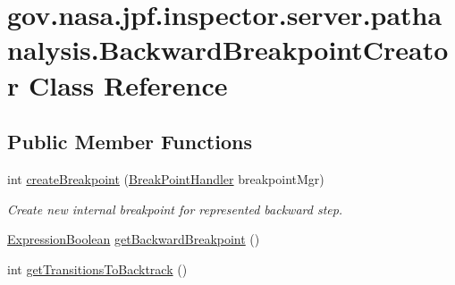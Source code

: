 \hypertarget{classgov_1_1nasa_1_1jpf_1_1inspector_1_1server_1_1pathanalysis_1_1_backward_breakpoint_creator}{}\section{gov.\+nasa.\+jpf.\+inspector.\+server.\+pathanalysis.\+Backward\+Breakpoint\+Creator Class Reference}
\label{classgov_1_1nasa_1_1jpf_1_1inspector_1_1server_1_1pathanalysis_1_1_backward_breakpoint_creator}
\subsection*{Public Member Functions}
\begin{DoxyCompactItemize}
\item 
int \hyperlink{classgov_1_1nasa_1_1jpf_1_1inspector_1_1server_1_1pathanalysis_1_1_backward_breakpoint_creator_aa397e2c3d0f2825ec1602e733b844352}{create\+Breakpoint} (\hyperlink{classgov_1_1nasa_1_1jpf_1_1inspector_1_1server_1_1breakpoints_1_1_break_point_handler}{Break\+Point\+Handler} breakpoint\+Mgr)
\begin{DoxyCompactList}\small\item\em Create new internal breakpoint for represented backward step. \end{DoxyCompactList}\item 
\hyperlink{classgov_1_1nasa_1_1jpf_1_1inspector_1_1server_1_1expression_1_1_expression_boolean}{Expression\+Boolean} \hyperlink{classgov_1_1nasa_1_1jpf_1_1inspector_1_1server_1_1pathanalysis_1_1_backward_breakpoint_creator_a6a618a1e50c394ef1c9bafcc90bc1c87}{get\+Backward\+Breakpoint} ()
\item 
int \hyperlink{classgov_1_1nasa_1_1jpf_1_1inspector_1_1server_1_1pathanalysis_1_1_backward_breakpoint_creator_a9d62eac2f2b8f776a5f792531d27f04b}{get\+Transitions\+To\+Backtrack} ()
\end{DoxyCompactItemize}
